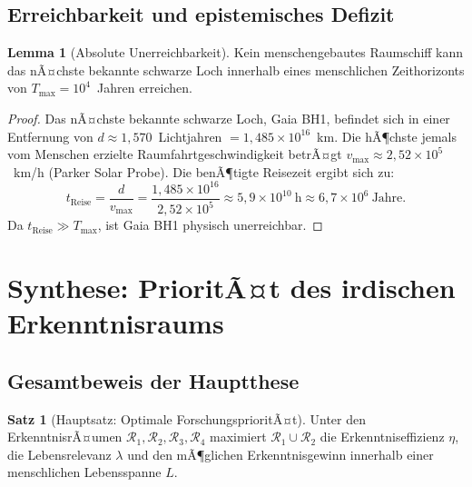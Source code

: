 ﻿\documentclass[a4paper,12pt]{article}
\theoremstyle{definition}
\newtheorem{satz}{Satz}
\newtheorem{lemma}{Lemma}
\begin{document}
\subsection{Erreichbarkeit und epistemisches Defizit}

\begin{lemma}[Absolute Unerreichbarkeit]
\label{lem:unerreichbarkeit}
    Kein menschengebautes Raumschiff kann das nÃ¤chste bekannte schwarze Loch
    innerhalb eines menschlichen Zeithorizonts von $T_{\max} = 10^4$~Jahren
    erreichen.
\end{lemma}

\begin{proof}
    Das nÃ¤chste bekannte schwarze Loch, Gaia BH1, befindet sich in einer
    Entfernung von $d \approx 1{,}570$~Lichtjahren $= 1{,}485 \times 10^{16}$~km.
    Die hÃ¶chste jemals vom Menschen erzielte Raumfahrtgeschwindigkeit betrÃ¤gt
    $v_{\max} \approx 2{,}52 \times 10^5$~km/h (Parker Solar Probe).
    Die benÃ¶tigte Reisezeit ergibt sich zu:
    \[
        t_{\text{Reise}} = \frac{d}{v_{\max}}
        = \frac{1{,}485 \times 10^{16}}{2{,}52 \times 10^5}
        \approx 5{,}9 \times 10^{10}~\text{h}
        \approx 6{,}7 \times 10^6~\text{Jahre}.
    \]
    Da $t_{\text{Reise}} \gg T_{\max}$, ist Gaia BH1 physisch unerreichbar.
    \qedhere
\end{proof}

\section{Synthese: PrioritÃ¤t des irdischen Erkenntnisraums}

\subsection{Gesamtbeweis der Hauptthese}

\begin{satz}[Hauptsatz: Optimale ForschungsprioritÃ¤t]
\label{satz:hauptsatz}
    Unter den ErkenntnisrÃ¤umen $\mathcal{R}_1, \mathcal{R}_2, \mathcal{R}_3,
    \mathcal{R}_4$ maximiert $\mathcal{R}_1 \cup \mathcal{R}_2$ die
    Erkenntniseffizienz $\eta$, die Lebensrelevanz $\lambda$ und den
    mÃ¶glichen Erkenntnisgewinn innerhalb einer menschlichen Lebensspanne $L$.
\end{satz}
\end{document}
